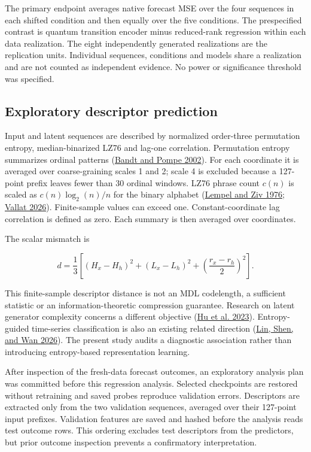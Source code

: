 \documentclass[
  11pt,
]{article}
\begin{document}
The primary endpoint averages native forecast MSE over the four
sequences in each shifted condition and then equally over the five
conditions. The prespecified contrast is quantum transition encoder
minus reduced-rank regression within each data realization. The eight
independently generated realizations are the replication units.
Individual sequences, conditions and models share a realization and are
not counted as independent evidence. No power or significance threshold
was specified.

\hypertarget{exploratory-descriptor-prediction}{%
\subsection{Exploratory descriptor
prediction}\label{exploratory-descriptor-prediction}}

Input and latent sequences are described by normalized order-three
permutation entropy, median-binarized LZ76 and lag-one correlation.
Permutation entropy summarizes ordinal patterns
(\protect\hyperlink{ref-bandt2002permutation}{Bandt and Pompe 2002}).
For each coordinate it is averaged over coarse-graining scales 1 and 2;
scale 4 is excluded because a 127-point prefix leaves fewer than 30
ordinal windows. LZ76 phrase count \(c(n)\) is scaled as
\(c(n)\log_2(n)/n\) for the binary alphabet
(\protect\hyperlink{ref-lempel1976complexity}{Lempel and Ziv 1976};
\protect\hyperlink{ref-vallat2026antropy}{Vallat 2026}). Finite-sample
values can exceed one. Constant-coordinate lag correlation is defined as
zero. Each summary is then averaged over coordinates.

The scalar mismatch is

\[d=\frac{1}{3}\left[(H_x-H_h)^2+(L_x-L_h)^2+
\left(\frac{r_x-r_h}{2}\right)^2\right].\]

This finite-sample descriptor distance is not an MDL codelength, a
sufficient statistic or an information-theoretic compression guarantee.
Research on latent generator complexity concerns a different objective
(\protect\hyperlink{ref-hu2023complexity}{Hu et al. 2023}).
Entropy-guided time-series classification is also an existing related
direction (\protect\hyperlink{ref-lin2026entrots}{Lin, Shen, and Wan
2026}). The present study audits a diagnostic association rather than
introducing entropy-based representation learning.

After inspection of the fresh-data forecast outcomes, an exploratory
analysis plan was committed before this regression analysis. Selected
checkpoints are restored without retraining and saved probes reproduce
validation errors. Descriptors are extracted only from the two
validation sequences, averaged over their 127-point input prefixes.
Validation features are saved and hashed before the analysis reads test
outcome rows. This ordering excludes test descriptors from the
predictors, but prior outcome inspection prevents a confirmatory
interpretation.
\end{document}
